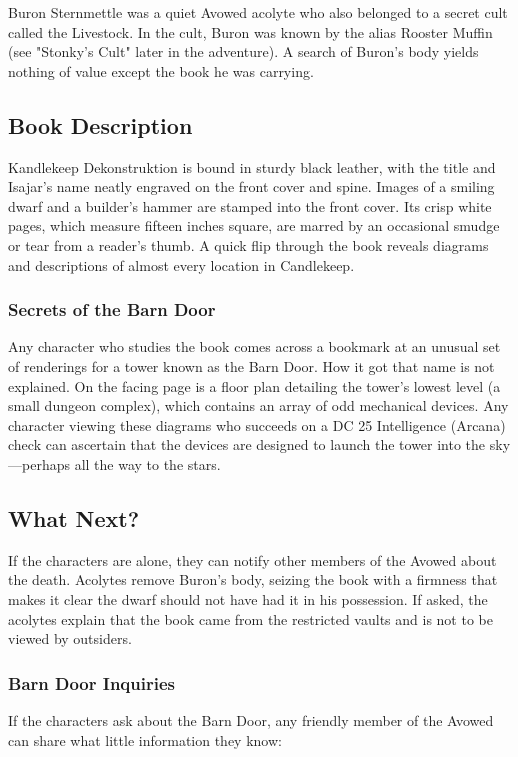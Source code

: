 \documentclass[10pt,a4paper,twoside,bg=print,twocolumn,openany,nodeprecatedcode]{dndbook}
\begin{document}
Buron Sternmettle was a quiet Avowed acolyte who also belonged to a secret cult called the Livestock. In the cult, Buron was known by the alias Rooster Muffin (see "Stonky's Cult" later in the adventure). A search of Buron's body yields nothing of value except the book he was carrying.

\subsection{Book Description}
Kandlekeep Dekonstruktion is bound in sturdy black leather, with the title and Isajar's name neatly engraved on the front cover and spine. Images of a smiling dwarf and a builder's hammer are stamped into the front cover. Its crisp white pages, which measure fifteen inches square, are marred by an occasional smudge or tear from a reader's thumb. A quick flip through the book reveals diagrams and descriptions of almost every location in Candlekeep.

\subsubsection{Secrets of the Barn Door}
Any character who studies the book comes across a bookmark at an unusual set of renderings for a tower known as the Barn Door. How it got that name is not explained. On the facing page is a floor plan detailing the tower's lowest level (a small dungeon complex), which contains an array of odd mechanical devices. Any character viewing these diagrams who succeeds on a DC 25 Intelligence (Arcana) check can ascertain that the devices are designed to launch the tower into the sky—perhaps all the way to the stars.

\subsection{What Next?}
If the characters are alone, they can notify other members of the Avowed about the death. Acolytes remove Buron's body, seizing the book with a firmness that makes it clear the dwarf should not have had it in his possession. If asked, the acolytes explain that the book came from the restricted vaults and is not to be viewed by outsiders.

\subsubsection{Barn Door Inquiries}
If the characters ask about the Barn Door, any friendly member of the Avowed can share what little information they know:
\end{document}

